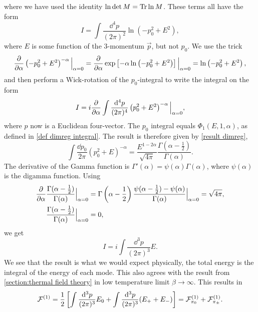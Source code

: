 where we have used the identity $\ln\det M = \Tr \ln M $.
These terms all have the form
\begin{equation}
    I = \int \frac{\dd^4 p}{(2 \pi)^2} \ln(-p_0^2 + E^2),
\end{equation}
where $E$ is some function of the 3-momentum $\vec p$, but not $p_0$.
We use the trick
\begin{equation}
    \pdv{\alpha} \left(-p_0^2 + E^2\right)^{-\alpha} \Big|_{\alpha=0}
    = \pdv{\alpha} \exp\left[ -\alpha \ln\left(- p_0^2 + E^2\right)  \right] \Big|_{\alpha=0}
    = \ln\left(- p_0^2 + E^2\right),
\end{equation}
and then perform a Wick-rotation of the $p_0$-integral to write the integral on the form 
\begin{equation}
    I = i \pdv{\alpha} \int \frac{\dd^4 p}{(2 \pi)^4} \left(p_0^2 + E^2\right)^{-\alpha} \Big|_{\alpha=0},
\end{equation}
where $p$ now is a Euclidean four-vector.
The $p_0$ integral equals $\Phi_1(E, 1, \alpha)$, as defined in \autoref{def dimreg integral}. 
The result is therefore given by \autoref{result dimreg},
\begin{equation}
    \int \frac{\dd p_0}{2 \pi} (p_0^2 + E)^{-\alpha} 
    = \frac{E^{1-2\alpha}}{\sqrt{4 \pi}} \frac{\Gamma(\alpha-\frac{1}{2})}{\Gamma(\alpha)}.
\end{equation}
The derivative of the Gamma function is $\Gamma'(\alpha) = \psi(\alpha)\Gamma(\alpha)$, where $\psi(\alpha)$ is the digamma function.
Using
\begin{align}
    \diffp{}{\alpha} & \frac{\Gamma(\alpha - \frac{1}{2}) }{\Gamma(\alpha)} \Big|_{\alpha=0}
    = \Gamma\left(\alpha - \frac{1}{2}\right) \frac{\psi(\alpha - \frac{1}{2}) - \psi(\alpha)}{\Gamma(\alpha)} \Big|_{\alpha=0}
    = \sqrt{4 \pi}, \\
    & \frac{\Gamma(\alpha - \frac{1}{2}) }{\Gamma(\alpha)}\Big|_{\alpha=0} = 0,
\end{align}
we get
\begin{equation}
    I = i \int \frac{\dd^3 p}{(2 \pi)^3} E.
\end{equation}
We see that the result is what we would expect physically, the total energy is the integral of the energy of each mode.
This also agrees with the result from \autoref{section:thermal field theory} in low temperature limit $\beta \rightarrow \infty$.
This results in 
\begin{equation}
    \mathcal{F}^{(1)} = 
    \frac{1}{2} 
    \left[\int \frac{\dd^3 p}{(2\pi)^3} E_0 + \int  \frac{\dd^3 p}{(2\pi)^3} (E_+ + E_-)\right]
    = \mathcal{F}^{(1)}_{\pi_0} +\mathcal{F}^{(1)}_{\pi_\pm}.
\end{equation}
